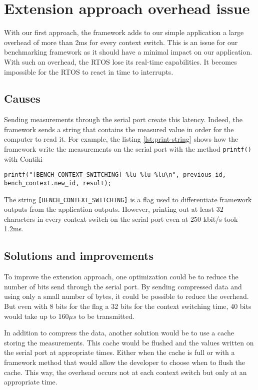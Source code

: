 \section{Extension approach overhead issue\label{sec:overhead}}

With our first approach, the framework adds to our simple application a large overhead of more than 2ms for every context switch.
This is an issue for our benchmarking framework as it should have a minimal impact on our application.
With such an overhead, the RTOS lose its real-time capabilities.
It becomes impossible for the RTOS to react in time to interrupts.

\subsection{Causes}

Sending measurements through the serial port create this latency.
Indeed, the framework sends a string that contains the measured value in order for the computer to read it.
For example, the listing \ref{lst:print-string} shows how the framework write the measurements on the serial port with the method \texttt{printf()} with Contiki

\begin{lstlisting}[style=CStyle, float, label={lst:print-string}, caption={writting the measurements to the serial port with Contiki}]
  printf("[BENCH_CONTEXT_SWITCHING] %lu %lu %lu\n", previous_id, bench_context.new_id, result);
\end{lstlisting}

The string \texttt{[BENCH\_CONTEXT\_SWITCHING]} is a flag used to differentiate framework outputs from the application outputs.
However, printing out at least 32 characters in every context switch on the serial port even at 250 kbit/s took 1.2ms.

\subsection{Solutions and improvements}

To improve the extension approach, one optimization could be to reduce the number of bits send through the serial port.
By sending compressed data and using only a small number of bytes, it could be possible to reduce the overhead.
But even with 8 bits for the flag a 32 bits for the context switching time, 40 bits would take up to $160\mu s$ to be transmitted.

In addition to compress the data, another solution would be to use a cache storing the measurements.
This cache would be flushed and the values written on the serial port at appropriate times.
Either when the cache is full or with a framework method that would allow the developer to choose when to flush the cache.
This way, the overhead occurs not at each context switch but only at an appropriate time.

